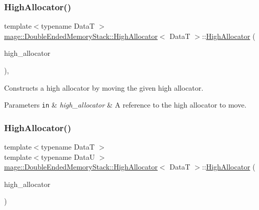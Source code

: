 \subsubsection{\texorpdfstring{High\+Allocator()}{HighAllocator()}\hspace{0.1cm}{\footnotesize\ttfamily [2/4]}}
{\footnotesize\ttfamily template$<$typename DataT $>$ \\
\mbox{\hyperlink{classmage_1_1_double_ended_memory_stack_1_1_high_allocator}{mage\+::\+Double\+Ended\+Memory\+Stack\+::\+High\+Allocator}}$<$ DataT $>$\+::\mbox{\hyperlink{classmage_1_1_double_ended_memory_stack_1_1_high_allocator}{High\+Allocator}} (\begin{DoxyParamCaption}\item[{\mbox{\hyperlink{classmage_1_1_double_ended_memory_stack_1_1_high_allocator}{High\+Allocator}}$<$ DataT $>$ \&\&}]{high\+\_\+allocator }\end{DoxyParamCaption})\hspace{0.3cm}{\ttfamily [default]}, {\ttfamily [noexcept]}}

Constructs a high allocator by moving the given high allocator.


\begin{DoxyParams}[1]{Parameters}
\mbox{\tt in}  & {\em high\+\_\+allocator} & A reference to the high allocator to move. \\
\hline
\end{DoxyParams}
\mbox{\label{classmage_1_1_double_ended_memory_stack_1_1_high_allocator_a6210e1fbac98efbf26ddf6cbe8fe6be8}} 
\subsubsection{\texorpdfstring{High\+Allocator()}{HighAllocator()}\hspace{0.1cm}{\footnotesize\ttfamily [3/4]}}
{\footnotesize\ttfamily template$<$typename DataT $>$ \\
template$<$typename DataU $>$ \\
\mbox{\hyperlink{classmage_1_1_double_ended_memory_stack_1_1_high_allocator}{mage\+::\+Double\+Ended\+Memory\+Stack\+::\+High\+Allocator}}$<$ DataT $>$\+::\mbox{\hyperlink{classmage_1_1_double_ended_memory_stack_1_1_high_allocator}{High\+Allocator}} (\begin{DoxyParamCaption}\item[{const \mbox{\hyperlink{classmage_1_1_double_ended_memory_stack_1_1_high_allocator}{High\+Allocator}}$<$ DataU $>$ \&}]{high\+\_\+allocator }\end{DoxyParamCaption})\hspace{0.3cm}{\ttfamily [noexcept]}}

